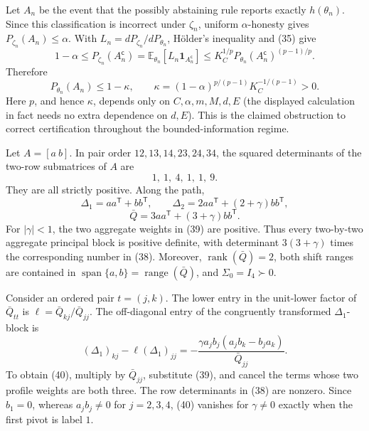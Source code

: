 Let \(A_n\) be the event that the possibly abstaining rule reports exactly \(h(\theta_n)\).  Since this classification is incorrect under \(\zeta_n\), uniform \(\alpha\)-honesty gives \(P_{\zeta_n}(A_n)\le\alpha\).  With \(L_n=dP_{\zeta_n}/dP_{\theta_n}\), H\"older's inequality and (35) give
\[
 1-\alpha
 \le P_{\zeta_n}(A_n^{\mathsf c})
 =\mathbb E_{\theta_n}[L_n\mathbf 1_{A_n^{\mathsf c}}]
 \le K_C^{1/p}P_{\theta_n}(A_n^{\mathsf c})^{(p-1)/p}. \tag{36}
\]
Therefore
\[
 P_{\theta_n}(A_n)\le1-\kappa,
 \qquad
 \kappa=(1-\alpha)^{p/(p-1)}K_C^{-1/(p-1)}>0. \tag{37}
\]
Here \(p\), and hence \(\kappa\), depends only on \(C,\alpha,m,M,d,E\) (the displayed calculation in fact needs no extra dependence on \(d,E\)).  This is the claimed obstruction to correct certification throughout the bounded-information regime.

Let \(A=[a\ b]\).  In pair order \(12,13,14,23,24,34\), the squared determinants of the two-row submatrices of \(A\) are
\[
 1,\ 1,\ 4,\ 1,\ 1,\ 9. \tag{38}
\]
They are all strictly positive.  Along the path,
\[
 \Delta_1=aa^{\mathsf T}+bb^{\mathsf T},\qquad
 \Delta_2=2aa^{\mathsf T}+(2+\gamma)bb^{\mathsf T},
\]
\[
 \bar Q=3aa^{\mathsf T}+(3+\gamma)bb^{\mathsf T}. \tag{39}
\]
For \(|\gamma|<1\), the two aggregate weights in (39) are positive.  Thus every two-by-two aggregate principal block is positive definite, with determinant \(3(3+\gamma)\) times the corresponding number in (38).  Moreover, \(\operatorname{rank}(\bar Q)=2\), both shift ranges are contained in \(\operatorname{span}\{a,b\}=\operatorname{range}(\bar Q)\), and \(\Sigma_0=I_4\succ0\).

Consider an ordered pair \(t=(j,k)\).  The lower entry in the unit-lower factor of \(\bar Q_{tt}\) is \(\ell=\bar Q_{kj}/\bar Q_{jj}\).  The off-diagonal entry of the congruently transformed \(\Delta_1\)-block is
\[
 (\Delta_1)_{kj}-\ell(\Delta_1)_{jj}
 =-\frac{\gamma a_jb_j(a_jb_k-b_ja_k)}{\bar Q_{jj}}. \tag{40}
\]
To obtain (40), multiply by \(\bar Q_{jj}\), substitute (39), and cancel the terms whose two profile weights are both three.  The row determinants in (38) are nonzero.  Since \(b_1=0\), whereas \(a_jb_j\ne0\) for \(j=2,3,4\), (40) vanishes for \(\gamma\ne0\) exactly when the first pivot is label \(1\).

